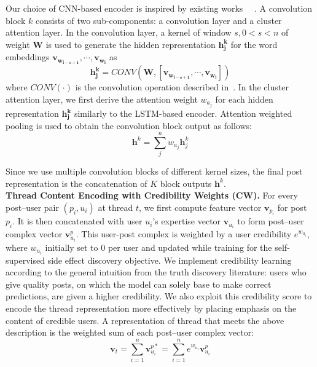 \documentclass{bmcart}
\begin{document}
Our choice of CNN-based encoder is inspired by existing works
~\cite{kim2014convolutional}~\cite{yin2016abcnn}. A convolution block $k$ consists of two sub-components: a convolution layer and a cluster attention layer. In the convolution layer, a kernel of window $s, 0 < s < n$ of weight $\boldsymbol{W}$ is used to generate the hidden representation $\boldsymbol{h^k_j}$ for the word embeddings
$\boldsymbol{v_{w_{i-s+1}}},\cdots,\boldsymbol{v_{w_i}}$ as 
\begin{equation}
    \boldsymbol{h^k_j} = CONV(\boldsymbol{W}, [\boldsymbol{v_{w_{i-s+1}}},\cdots,\boldsymbol{v_{w_i}}])
\end{equation} 
where $CONV(\cdot)$ is the convolution operation described in~\cite{kim2014convolutional}. In the cluster attention layer, we first derive the attention weight $w_{a_j}$ for each hidden representation $\boldsymbol{h^k_j}$ similarly to the LSTM-based encoder. Attention weighted pooling is used to obtain the convolution block output as follows: 
\begin{equation}
    \boldsymbol{h}^k=\sum^n_j w_{a_j} \boldsymbol{h}^k_j
\end{equation}

Since we use multiple convolution blocks of different kernel sizes, the final post representation is the concatenation of $K$ block outputs $\boldsymbol{h}^k$. \\


\textbf{Thread Content Encoding with Credibility Weights (CW).}\label{sec:CW} For every post--user pair $\left(p_i, u_i\right)$ at thread $t$, we first compute 
feature vector $\boldsymbol{v}_{p_{i}}$ for post $p_{i}$. It is then concatenated with user $u_i$'s expertise vector $\boldsymbol{v}_{u_{i}}$
to form post--user complex vector $\boldsymbol{v}^{p}_{u_i}$. This
user-post complex is weighted by a user credibility $e^{w_{u_i}}$,
where $w_{u_i}$ initially set to 0 per user and updated while training for the self-supervised side effect discovery objective.
We implement credibility learning according to the general intuition from the truth discovery literature: users who give quality posts, on which the model can solely base to make correct predictions, are given a higher credibility. We also exploit this credibility score to encode the thread representation more effectively by placing emphasis on the content of credible users. A representation of thread that meets the above description is the weighted sum of each post--user complex vector:
\begin{equation}\label{eq:user_credibility}
\boldsymbol{v}_{t} = \sum^n_{i=1} \boldsymbol{v}^{p\ast}_{u_i} = \sum^n_{i=1} e^{w_{u_i}} \boldsymbol{v}^p_{u_i} 
\end{equation} \\
\end{document}
